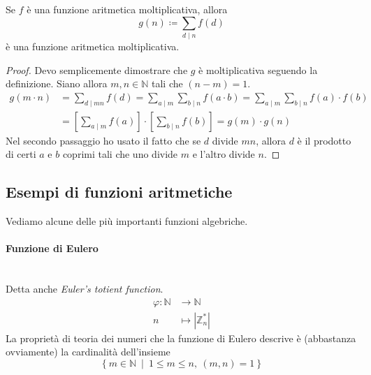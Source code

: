 \begin{proposizione}
	\label{somma_moltiplicativa}
	Se $f$ è una funzione aritmetica moltiplicativa, allora 
	\begin{equation*}
	g(n)\coloneqq \sum_{d\mid n}f(d)
	\end{equation*}
	è una funzione aritmetica moltiplicativa.
\end{proposizione}
\begin{proof}
	Devo semplicemente dimostrare che $g$ è moltiplicativa seguendo la definizione. Siano allora $m,n \in \mathbb{N}$ tali che $(n-m)=1$.
	\begin{align*}
	g(m \cdot n)&=\sum_{d\mid mn}f(d)=\sum_{a\mid m}\sum_{b\mid n}f(a\cdot b)=\sum_{a\mid m}\sum_{b\mid n}f(a)\cdot f(b) \\
	&=\left[\sum_{a\mid m}f(a)\right]\cdot\left[\sum_{b\mid n}f(b)\right]=g(m)\cdot g(n)
	\end{align*}
	Nel secondo passaggio ho usato il fatto che se $d$ divide $mn$, allora $d$ è il prodotto di certi $a$ e $b$ coprimi tali che uno divide $m$ e l'altro divide $n$.
\end{proof}




\subsection{Esempi di funzioni aritmetiche}
Vediamo alcune delle più importanti funzioni algebriche.
\paragraph{Funzione di Eulero} \ \\ Detta anche \textit{Euler's totient function}.
\begin{align*}
\varphi: \mathbb{N}&\longrightarrow \mathbb{N}\\
n &\longmapsto |\mathbb{Z}_n^*|
\end{align*}
La proprietà di teoria dei numeri che la funzione di Eulero descrive è (abbastanza ovviamente) la cardinalità dell'insieme
\begin{equation*}
\left\{m\in\mathbb{N} \ \middle| \ 1\leq m \leq n, \ (m,n)=1\right\}
\end{equation*}
